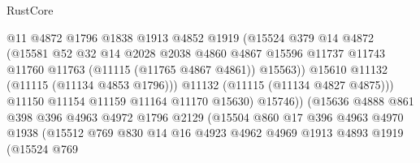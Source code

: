 \begin{lexlean}{RustCore}
\begin{coremodule}
                                  @11
                                  @4872
                                  @1796
                                  @1838
                                  @1913
                                  @4852
                                  @1919
                                  (@15524
                                    @379
                                    @14
                                    @4872
                                    (@15581
                                      @52
                                      @32
                                      @14
                                      @2028
                                      @2038
                                      @4860
                                      @4867
                                      @15596
                                      @11737
                                      @11743
                                      @11760
                                      @11763
                                      (@11115 (@11765 @4867 @4861))
                                      @15563))
                                  @15610
                                  @11132
                                  (@11115 (@11134 @4853 @1796)))
                                @11132
                                (@11115 (@11134 @4827 @4875)))
                              @11150
                              @11154
                              @11159
                              @11164
                              @11170
                              @15630)
                            @15746))
                        (@15636
                          @4888
                          @861
                          @398
                          @396
                          @4963
                          @4972
                          @1796
                          @2129
                          (@15504
                            @860
                            @17
                            @396
                            @4963
                            @4970
                            @1938
                            (@15512
                              @769
                              @830
                              @14
                              @16
                              @4923
                              @4962
                              @4969
                              @1913
                              @4893
                              @1919
                              (@15524
                                @769

\end{coremodule}
\end{lexlean}
